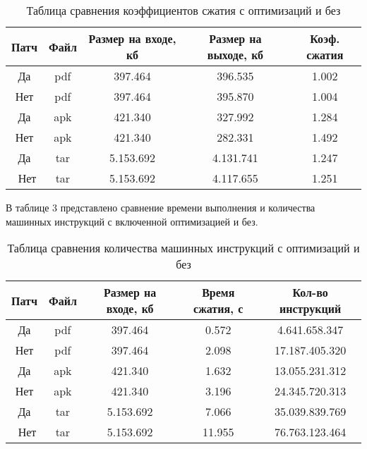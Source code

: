 \begin{table}[!htb]
	\label{table:coeffs}
	\begin{center}
		\caption{Таблица сравнения коэффициентов сжатия с оптимизаций и без}
		\begin{tabular}{|c|c|c|c|c|}
			\hline
			\bfseries Патч & \bfseries Файл & \bfseries Размер на входе, кб & \bfseries  Размер на выходе, кб & \bfseries Коэф. сжатия \\
			\hline
			Да & pdf & 397.464 & 396.535 & 1.002 \\ 
			Нет & pdf & 397.464 & 395.870 & 1.004 \\ \hline
			Да & apk & 421.340 & 327.992 & 1.284 \\ 
			Нет & apk & 421.340 &  282.331 & 1.492 \\ \hline
			Да & tar & 5.153.692 & 4.131.741 & 1.247 \\ \
			Нет & tar & 5.153.692 & 4.117.655 & 1.251 \\ \hline
		\end{tabular}
	\end{center}
\end{table}

В таблице 3 представлено сравнение времени выполнения и количества машинных инструкций с включенной оптимизацией и без.

\begin{table}[!htb]
	\label{table:time}
	\begin{center}
		\caption{Таблица сравнения количества машинных инструкций с оптимизаций и без}
		\begin{tabular}{|c|c|c|c|c|}
			\hline
			\bfseries Патч & \bfseries Файл & \bfseries Размер на входе, кб & \bfseries Время сжатия, с& \bfseries Кол-во инструкций \\
			\hline
			Да & pdf & 397.464 & 0.572 & 4.641.658.347 \\ 
			Нет & pdf & 397.464 & 2.098 & 17.187.405.320 \\ \hline
			Да & apk & 421.340 & 1.632 & 13.055.231.312 \\ 
			Нет & apk & 421.340 & 3.196 & 24.345.720.313 \\ \hline
			Да & tar & 5.153.692 & 7.066 & 35.039.839.769 \\ \
			Нет & tar & 5.153.692 & 11.955 & 76.763.123.464 \\ \hline
		\end{tabular}
	\end{center}
\end{table}

